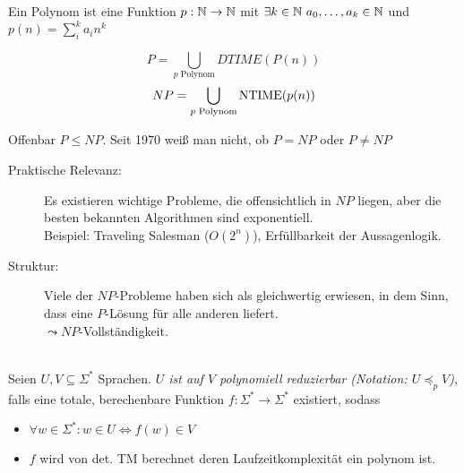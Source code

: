 \begin{Def}[name={[Polynom]}]
	Ein Polynom ist eine Funktion $p:\N\->\N$ mit $\exists k\in \mathbb{N}\ a_0,\dots,a_k\in\mathbb{N}$ und \mbox{$p(n)=\sum_i^k a_in^k$}
\end{Def}
\begin{Def}
 \[ P = \bigcup_{p\text{ Polynom}} DTIME(P(n)) \]
 \[ NP = \bigcup_{p\text{ Polynom}} \operatorname{NTIME}(p(n)) \]
 
\end{Def}



Offenbar $P\leq NP$. Seit 1970 weiß man nicht, ob $P=NP$ oder $P\neq NP$
\begin{description}
\item[Praktische Relevanz:] Es existieren wichtige Probleme, die offensichtlich in $NP$ liegen, aber die besten bekannten Algorithmen sind exponentiell.\\
	Beispiel: Traveling Salesman ($O(2^n)$), Erfüllbarkeit der Aussagenlogik.
\item[Struktur:] Viele der $NP$-Probleme haben sich als gleichwertig erwiesen, in dem Sinn, dass eine $P$-Lösung für alle anderen liefert.\\
	$\leadsto NP$-Vollständigkeit.
\end{description}


\begin{Def}\label{def:PolyReduktion}\ \\
  Seien $U, V \subseteq \Sigma^*$ Sprachen.
  \emph{$U$ ist auf $V$ polynomiell reduzierbar (Notation: $U \preceq_p V$)}, falls eine totale, berechenbare Funktion
  $f:\Sigma^* \to \Sigma^*$ existiert, sodass
  \begin{itemize}
   \item $\forall w \in \Sigma^*:w \in U \iff f(w) \in V$
   \item $f$ wird von det. TM berechnet deren Laufzeitkomplexität ein polynom ist.
  \end{itemize}
\end{Def}




